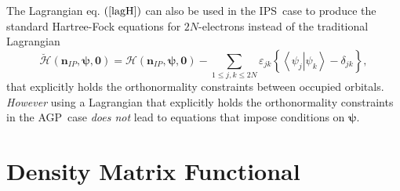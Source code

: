\documentclass[aps,preprint]{revtex4}%
\begin{document}
The Lagrangian eq. $\left(  \ref{lagH}\right)  $ can also be used in the
IPS\ case to produce the standard Hartree-Fock equations for $2N$-electrons
instead of the traditional Lagrangian
\begin{equation}
\mathcal{\breve{H}}\left(  \mathbf{n}_{IP}\mathbf{,\mathbf{\psi},0}\right)
=\mathcal{H}\left(  \mathbf{n}_{IP}\mathbf{,\mathbf{\psi},0}\right)
-\sum_{1\leq j,k\leq2N}\varepsilon_{jk}\left\{  \left\langle \left.  \psi
_{j}\right\vert \psi_{k}\right\rangle -\delta_{jk}\right\}  , \label{tradlag}%
\end{equation}
that explicitly holds the orthonormality constraints between occupied
orbitals. \emph{However }using a Lagrangian that explicitly holds the
orthonormality constraints in the AGP\ case \emph{does not} lead to equations
that impose conditions on $\mathbf{\mathbf{\psi}}$.

\section{Density Matrix Functional\label{DMF}}
\end{document}
